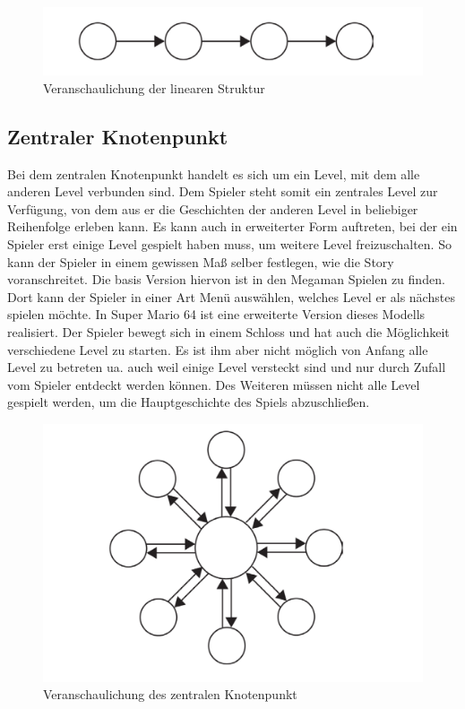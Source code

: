 \begin{figure}[H]
    \centering
    \includegraphics[width=.8\textwidth]{files/story/storyLinear}
    \caption{Veranschaulichung der linearen Struktur}
\end{figure}
 
\subsection{Zentraler Knotenpunkt} 
Bei dem zentralen Knotenpunkt handelt es sich um ein Level, mit dem alle anderen Level verbunden sind. Dem Spieler steht somit ein zentrales Level zur Verfügung, von dem aus er die Geschichten der anderen Level in beliebiger Reihenfolge erleben kann. Es kann auch in erweiterter Form auftreten, bei der ein Spieler erst einige Level gespielt haben muss, um weitere Level freizuschalten. So kann der Spieler in einem gewissen Maß selber festlegen, wie die Story voranschreitet. 
Die basis Version hiervon ist in den Megaman Spielen zu finden. Dort kann der Spieler in einer Art Menü auswählen, welches Level er als nächstes spielen möchte. In Super Mario 64 ist eine erweiterte Version dieses Modells realisiert. Der Spieler bewegt sich in einem Schloss und hat auch die Möglichkeit verschiedene Level zu starten. Es ist ihm aber nicht möglich von Anfang alle Level zu betreten ua. auch weil einige Level versteckt sind und nur durch Zufall vom Spieler entdeckt werden können. Des Weiteren müssen nicht alle Level gespielt werden, um die Hauptgeschichte des Spiels abzuschließen.


\begin{figure}[H]
    \centering
    \includegraphics[width=.8\textwidth]{files/story/storyZentralKnoten}
    \caption{Veranschaulichung des zentralen Knotenpunkt}
\end{figure}


